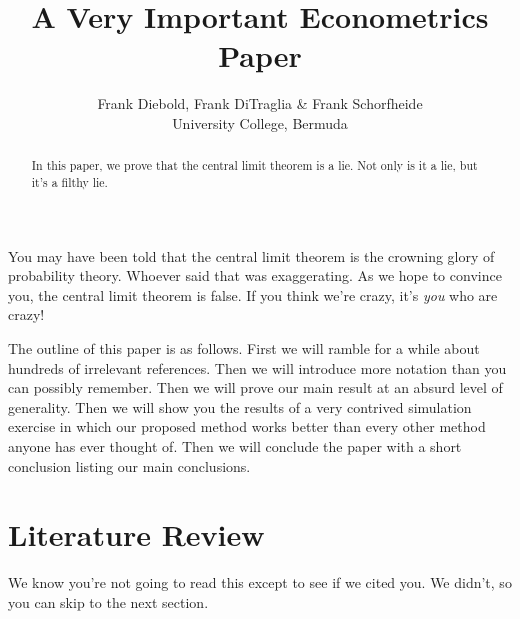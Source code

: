 \documentclass[12pt,letterpaper]{article}
\title{A Very Important Econometrics Paper}
\author{Frank Diebold, Frank DiTraglia \& Frank Schorfheide \\ University College, Bermuda}
\begin{document}
\maketitle

\begin{abstract}
	In this paper, we prove that the central limit theorem is a lie. 
	Not only is it a lie, but it's a filthy lie.
\end{abstract}

\noindent
You may have been told that the central limit theorem is the crowning glory of probability theory.
Whoever said that was exaggerating.
As we hope to convince you, the central limit theorem is false.
If you think we're crazy, it's \emph{you} who are crazy!

The outline of this paper is as follows.
First we will ramble for a while about hundreds of irrelevant references.
Then we will introduce more notation than you can possibly remember.
Then we will prove our main result at an absurd level of generality.
Then we will show you the results of a very contrived simulation exercise in which our proposed method works better than every other method anyone has ever thought of.
Then we will conclude the paper with a short conclusion listing our main conclusions.

\section{Literature Review}
We know you're not going to read this except to see if we cited you.
We didn't, so you can skip to the next section.
\end{document}
